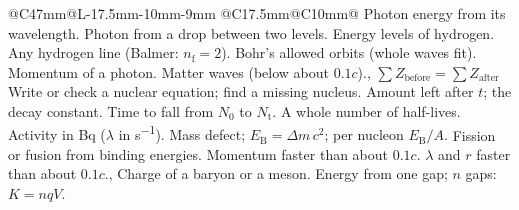 {\begin{longtable}{@{}C{47mm}@{\hspace{3mm}}L{\dimexpr\linewidth-47mm-17.5mm-10mm-9mm\relax}%
    @{\hspace{3mm}}C{17.5mm}@{\hspace{3mm}}C{10mm}@{}}
    {Photon energy from its wavelength.}{}
    {Photon from a drop between two levels.}{}
    {Energy levels of hydrogen.}{}
    {Any hydrogen line (Balmer: $n_\mathrm{f} = 2$).}{}
    {Bohr's allowed orbits (whole waves fit).}{}
    {Momentum of a photon.}{}
    {Matter waves (below about $0.1c$).}{, }
  \fgnext
    {$\sum Z_\mathrm{before} = \sum Z_\mathrm{after}$}
    {Write or check a nuclear equation; find a missing nucleus.}{}
    {Amount left after $t$; the decay constant.}{}
    {Time to fall from $N_0$ to $N_\mathrm{t}$.}{}
    {A whole number of half-lives.}{}
    {Activity in Bq ($\lambda$ in \si{s^{-1}}).}{}
    {Mass defect; $E_\mathrm{B} = \Delta m\,c^2$; per nucleon $E_\mathrm{B}/A$.}
    {}
    {Fission or fusion from binding energies.}{}
  \fgnext
    {Momentum faster than about $0.1c$.}{}
    {$\lambda$ and $r$ faster than about $0.1c$.}{, }
    {Charge of a baryon or a meson.}{}
    {Energy from one gap; $n$ gaps: $K = nqV$.}{}

\end{longtable}}

